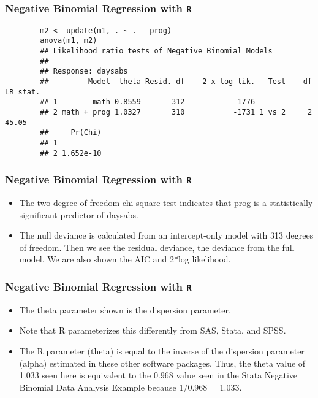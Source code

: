 \documentclass[00-GLMregslides.tex]{subfiles}
\begin{document}
\begin{frame}[fragile]
	\frametitle{Negative Binomial Regression with \texttt{R} }
	\normalsize
	\begin{framed}
		\begin{verbatim}	
		m2 <- update(m1, . ~ . - prog)
		anova(m1, m2)
		## Likelihood ratio tests of Negative Binomial Models
		## 
		## Response: daysabs
		##         Model  theta Resid. df    2 x log-lik.   Test    df LR stat.
		## 1        math 0.8559       312           -1776                      
		## 2 math + prog 1.0327       310           -1731 1 vs 2     2    45.05
		##     Pr(Chi)
		## 1          
		## 2 1.652e-10
		\end{verbatim}
	\end{framed}
\end{frame}
\begin{frame}[fragile]
	\frametitle{Negative Binomial Regression with \texttt{R} }
	\Large
	
	\begin{itemize}
	\item The two degree-of-freedom chi-square test indicates that prog is a statistically significant predictor of daysabs.
	\item The null deviance is calculated from an intercept-only model with 313 degrees of freedom. Then we see the residual deviance, the deviance from the full model. We are also shown the AIC and 2*log likelihood.
\end{itemize}
\end{frame}
\begin{frame}[fragile]
	\frametitle{Negative Binomial Regression with \texttt{R} }
	\Large
\begin{itemize}
	\item The theta parameter shown is the dispersion parameter. 
	\item Note that R parameterizes this differently from SAS, Stata, and SPSS. 
	\item The R parameter (theta) is equal to the inverse of the dispersion parameter (alpha) estimated in these other software packages. Thus, the theta value of 1.033 seen here is equivalent to the 0.968 value seen in the Stata Negative Binomial Data Analysis Example because 1/0.968 = 1.033.
\end{itemize}
\end{frame}
\end{document}
